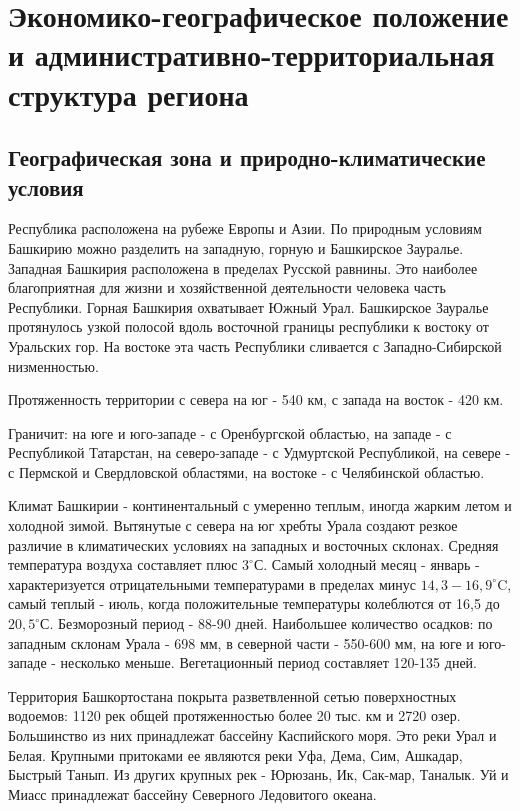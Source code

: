 	
\section{Экономико-географическое положение и административно-территориальная структура региона}

\subsection{Географическая зона и природно-климатические условия}

Республика расположена на рубеже Европы и Азии. По природным условиям Башкирию можно разделить на западную, горную и Башкирское Зауралье. Западная Башкирия расположена в пределах Русской равнины. Это наиболее благоприятная для жизни и хозяйственной деятельности человека часть Республики. Горная Башкирия охватывает Южный Урал. Башкирское Зауралье протянулось узкой полосой вдоль восточной границы республики к востоку от Уральских гор. На востоке эта часть Республики сливается с Западно-Сибирской низменностью.

Протяженность территории с севера на юг - 540 км, с запада на восток - 420 км.

Граничит: на юге и юго-западе - с Оренбургской областью, на западе - с Республикой Татарстан, на северо-западе - с Удмуртской Республикой, на севере - с Пермской и Свердловской областями, на востоке - с Челябинской областью.

Климат Башкирии - континентальный с умеренно теплым, иногда жарким летом и холодной зимой. Вытянутые с севера на юг хребты Урала создают резкое различие в климатических условиях на западных и восточных склонах. Средняя температура воздуха составляет плюс $3^{\circ}$С. Самый холодный месяц - январь - характеризуется отрицательными температурами в пределах минус $14,3-16,9^{\circ}$C, самый теплый - июль, когда положительные температуры колеблются от 16,5 до $20,5^{\circ}$С. Безморозный период - 88-90 дней. Наибольшее количество осадков: по западным склонам Урала - 698 мм, в северной части - 550-600 мм, на юге и юго-западе - несколько меньше. Вегетационный период составляет 120-135 дней.

Территория Башкортостана покрыта разветвленной сетью поверхностных водоемов: 1120 рек общей протяженностью более 20 тыс. км и 2720 озер. Большинство из них принадлежат бассейну Каспийского моря. Это реки Урал и Белая. Крупными притоками ее являются реки Уфа, Дема, Сим, Ашкадар, Быстрый Танып. Из других крупных рек - Юрюзань, Ик, Сак-мар, Таналык. Уй и Миасс принадлежат бассейну Северного Ледовитого океана.

